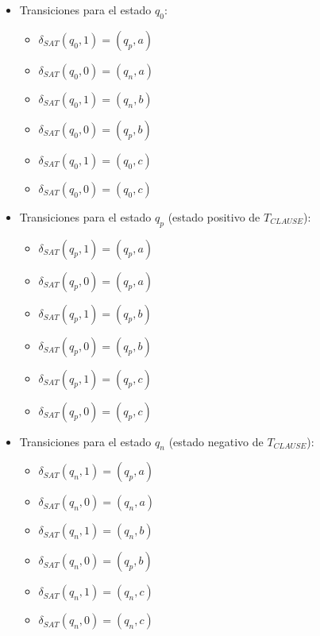 \documentclass[12pt]{article}
\begin{document}
\begin{itemize}
    \item Transiciones para el estado $q_0$:
          \begin{multicols}{2}
              \begin{itemize}
                  \item $\delta_{SAT}(q_0,1)=(q_p,a)$
                  \item $\delta_{SAT}(q_0,0)=(q_n,a)$
                  \item $\delta_{SAT}(q_0,1)=(q_n,b)$
                  \item $\delta_{SAT}(q_0,0)=(q_p,b)$
                  \item $\delta_{SAT}(q_0,1)=(q_0,c)$
                  \item $\delta_{SAT}(q_0,0)=(q_0,c)$
              \end{itemize}
          \end{multicols}
          
    \item Transiciones para el estado $q_p$ (estado positivo de $T_{CLAUSE}$):
          \begin{multicols}{2}
              \begin{itemize}
                  \item $\delta_{SAT}(q_{p},1)=(q_{p},a)$
                  \item $\delta_{SAT}(q_{p},0)=(q_{p},a)$
                  \item $\delta_{SAT}(q_{p},1)=(q_{p},b)$
                  \item $\delta_{SAT}(q_{p},0)=(q_{p},b)$
                  \item $\delta_{SAT}(q_{p},1)=(q_{p},c)$
                  \item $\delta_{SAT}(q_{p},0)=(q_{p},c)$
              \end{itemize}
          \end{multicols}
          
    \item Transiciones para el estado $q_n$ (estado negativo de $T_{CLAUSE}$):
          \begin{multicols}{2}
              \begin{itemize}
                  \item $\delta_{SAT}(q_{n},1)=(q_{p},a)$
                  \item $\delta_{SAT}(q_{n},0)=(q_{n},a)$
                  \item $\delta_{SAT}(q_{n},1)=(q_{n},b)$
                  \item $\delta_{SAT}(q_{n},0)=(q_{p},b)$
                  \item $\delta_{SAT}(q_{n},1)=(q_{n},c)$
                  \item $\delta_{SAT}(q_{n},0)=(q_{n},c)$
              \end{itemize}
          \end{multicols}
\end{itemize}
\end{document}
